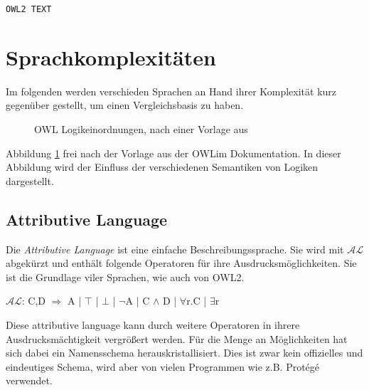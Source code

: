 \begin{verbatim}
OWL2 TEXT
\end{verbatim}


\section{Sprachkomplexitäten}
Im folgenden werden verschieden Sprachen an Hand ihrer Komplexität kurz gegenüber gestellt, um einen Vergleichsbasis zu haben.

\begin{figure}[htb]
	\caption{OWL Logikeinordnungen, nach einer Vorlage aus \cite{OWLimLayerMap}}
	\label{image-owl-layer-map}
	\begin{center}
	\end{center}
\end{figure}
Abbildung \ref{image-owl-layer-map} frei nach der Vorlage aus der OWLim Dokumentation. In dieser Abbildung wird der Einfluss der verschiedenen Semantiken von Logiken dargestellt.

\subsection{Attributive Language}
Die \emph{Attributive Language} ist eine einfache Beschreibungssprache. Sie wird mit $\mathcal{AL}$ abgekürzt und enthält folgende Operatoren für ihre Ausdrucksmöglichkeiten. Sie ist die Grundlage viler Sprachen, wie auch von OWL2.

$\mathcal{AL}$: C,D $\Longrightarrow$ A | $\top$ | $\bot$ | $\lnot$A | C $\land$ D | $\forall$r.C | $\exists$r

Diese attributive language kann durch weitere Operatoren in ihrere Ausdrucksmächtigkeit vergrößert werden. Für die Menge an Möglichkeiten hat sich dabei ein Namensschema herauskristallisiert. Dies ist zwar kein offizielles und eindeutiges Schema, wird aber von vielen Programmen wie z.B. Protégé verwendet.

